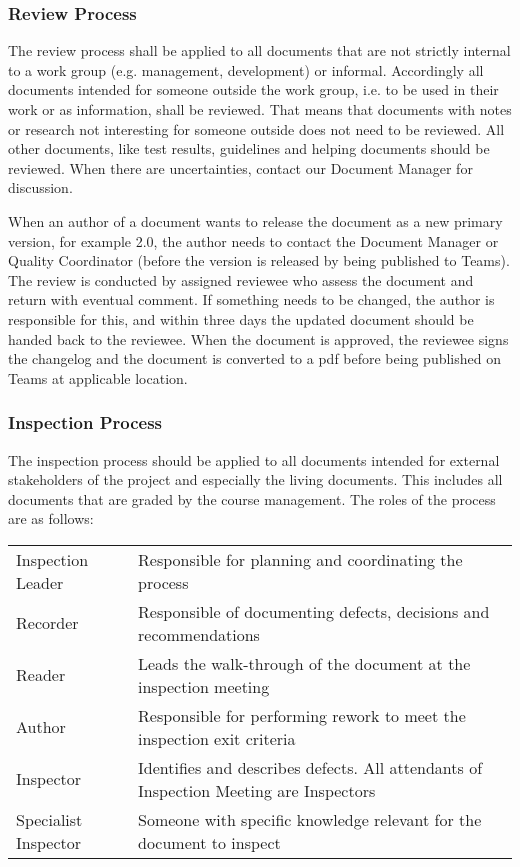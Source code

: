 \documentclass{article}
\begin{document}
	\subsubsection{Review Process}
	The review process shall be applied to all documents that are not strictly internal to a work group (e.g. management, development) or informal. Accordingly all documents intended for someone outside the work group, i.e. to be used in their work or as information, shall be reviewed. 
	That means that documents with notes or research not interesting for someone outside does not need to be reviewed. All other documents, like test results, guidelines and helping documents should be reviewed. When there are uncertainties, contact our Document Manager for discussion.
	
	When an author of a document wants to release the document as a new primary version, for example 2.0, the author needs to contact the Document Manager or Quality Coordinator (before the version is released by being published to Teams). The review is conducted by assigned reviewee who assess the document and return with eventual comment. If something needs to be changed, the author is responsible for this, and within three days the updated document should be handed back to the reviewee. When the document is approved, the reviewee signs the changelog and the document is converted to a pdf before being published on Teams at applicable location.
	
	\subsubsection{Inspection Process}
	The inspection process should be applied to all documents intended for external stakeholders of the project and especially the living documents. This includes all documents that are graded by the course management.
	The roles of the process are as follows:
	
	\smallskip
	\begin{table}[h]
		\begin{tabularx}{\textwidth}{lX}
			Inspection Leader & Responsible for planning and coordinating the process \\
			Recorder & Responsible of documenting defects, decisions and recommendations \\
			Reader & Leads the walk-through of the document at the inspection meeting \\
			Author & Responsible for performing rework to meet the inspection exit criteria \\
			Inspector & Identifies and describes defects. All attendants of Inspection Meeting are Inspectors \\
			Specialist Inspector & Someone with specific knowledge relevant for the document to inspect \\
		\end{tabularx}
	\end{table}
	
\end{document}
